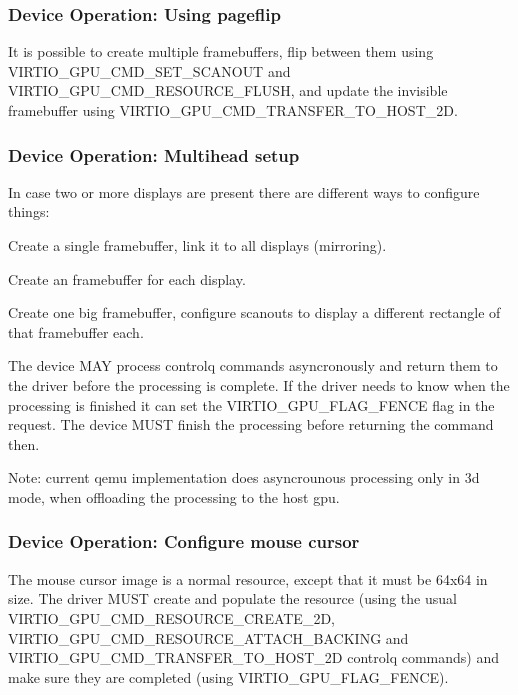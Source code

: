 \subsubsection{Device Operation: Using pageflip}

It is possible to create multiple framebuffers, flip between them
using VIRTIO_GPU_CMD_SET_SCANOUT and VIRTIO_GPU_CMD_RESOURCE_FLUSH,
and update the invisible framebuffer using
VIRTIO_GPU_CMD_TRANSFER_TO_HOST_2D.

\subsubsection{Device Operation: Multihead setup}

In case two or more displays are present there are different ways to
configure things:

\begin{itemize*}
\item Create a single framebuffer, link it to all displays
  (mirroring).
\item Create an framebuffer for each display.
\item Create one big framebuffer, configure scanouts to display a
  different rectangle of that framebuffer each.
\end{itemize*}


The device MAY process controlq commands asyncronously and return them
to the driver before the processing is complete.  If the driver needs
to know when the processing is finished it can set the
VIRTIO_GPU_FLAG_FENCE flag in the request.  The device MUST finish the
processing before returning the command then.

Note: current qemu implementation does asyncrounous processing only in
3d mode, when offloading the processing to the host gpu.

\subsubsection{Device Operation: Configure mouse cursor}

The mouse cursor image is a normal resource, except that it must be
64x64 in size.  The driver MUST create and populate the resource
(using the usual VIRTIO_GPU_CMD_RESOURCE_CREATE_2D,
VIRTIO_GPU_CMD_RESOURCE_ATTACH_BACKING and
VIRTIO_GPU_CMD_TRANSFER_TO_HOST_2D controlq commands) and make sure they
are completed (using VIRTIO_GPU_FLAG_FENCE).


